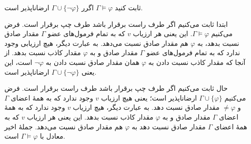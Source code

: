 ثابت کنید $\Gamma\models\varphi$ اگرر $\Gamma\cup\{\neg\varphi\}$ ارضاناپذیر است.
\begin{ans}
ابتدا ثابت می‌کنیم اگر طرف راست برقرار باشد طرف چپ برقرار است. فرض می‌کنیم $\Gamma\models\varphi$. این یعنی هر ارزیاب $v$ که به تمام فرمول‌های عضو $\Gamma$ مقدار صادق نسبت بدهد، به $\varphi$ هم مقدار صادق نسبت می‌دهد. به عبارت دیگر، هیچ ارزیابی وجود ندارد که به تمام فرمول‌های عضو $\Gamma$ مقدار صادق و به $\varphi$ مقدار کاذب نسبت بدهد. از آنجا که مقدار کاذب نسبت دادن به $\varphi$ همان مقدار صادق نسبت دادن به $\neg\varphi$ است، این یعنی $\Gamma\cup\{\neg\varphi\}$ ارضاناپذیر است.

حال ثابت می‌کنیم اگر طرف چپ برقرار باشد طرف راست برقرار است. فرض می‌کنیم $\Gamma\cup\{\varphi\}$ ارضاناپذیر است؛ یعنی هیچ ارزیاب $v$ وجود ندارد که به همهٔ اعضای $\Gamma$ و $\neq\varphi$ مقدار صادق نسبت دهد. به عبارت دیگر، هیچ ارزیاب $v$ وجود ندارد که به همهٔ اعضای $\Gamma$ مقدار صادق و به $\varphi$ مقدار کاذب نسبت بدهد. این یعنی هر ارزیاب $v$ که به همهٔ اعضای $\Gamma$ مقدار صادق نسبت دهد به $\varphi$ هم مقدار صادق نسبت می‌دهد. جملهٔ اخیر معادل با $\Gamma\models\varphi$ است.
\end{ans}
